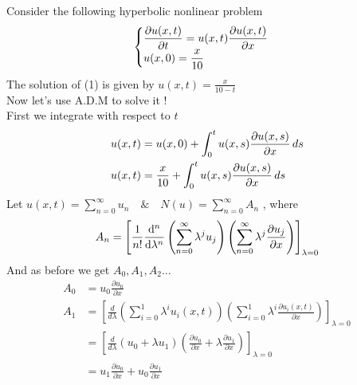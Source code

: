 


\setcounter{equation}{0}
\begin{example}
    Consider the following hyperbolic nonlinear problem\\
    \begin{equation}
        \begin{cases}
            \displaystyle \pdv{u(x,t)}{t} =  u(x,t)\pdv{u(x,t)}{ x}
            \\
            \displaystyle u(x,0) = \frac{x}{10}
        \end{cases}
    \end{equation}
    The solution of (1) is given by $\displaystyle u(x,t)=\frac{x}{10-t}$\\
    Now let's use A.D.M to solve it !\\
    First we integrate with respect to $t$
    \begin{align*}
        u(x,t) & = u(x,0) + \int_{0}^{t} u(x,s) \pdv{u(x,s)}{x} \, ds
        \\
        u(x,t) & = \frac{x}{10} + \int_{0}^{t} u(x,s) \pdv{u(x,s)}{x} \, ds
    \end{align*}
    Let $\displaystyle u(x,t) = \sum_{n=0}^{\infty} u_n \quad \& \quad N(u) = \sum_{n=0}^{\infty} A_n$ , where
    \begin{equation*}
        A_n = \left[ \frac{1}{n!} \dv[n]{}{\lambda}  \left( \sum_{n=0}^{\infty} \lambda^j u_j \right) \left( \sum_{n=0}^{\infty}\lambda^j \pdv{u_j}{x} \right) \right]_{\lambda = 0}
    \end{equation*}
    And as before we get $A_0,A_1,A_2\dots$
    \begin{align*}
        A_0 & = u_0\frac{\partial u_0}{\partial x}
        \\
        A_1 & = \left[\frac{d}{d \lambda} \left(\sum_{i=0}^{1}  \lambda^i u_i(x,t)\right)\left(\sum_{i=0}^{1}  \lambda^i \frac{\partial u_i(x,t)}{\partial x}\right)\right]_{\lambda = 0}
        \\
            & = \left[\frac{d}{d \lambda} \left(u_0 + \lambda u_1 \right)\left(\frac{\partial u_0}{\partial x} + \lambda\frac{\partial u_1}{\partial x}\right)\right]_{\lambda = 0}
        \\
            & = u_1 \frac{\partial u_0}{\partial x} + u_0 \frac{\partial u_1}{\partial x}

\end{align*}
\end{example}
